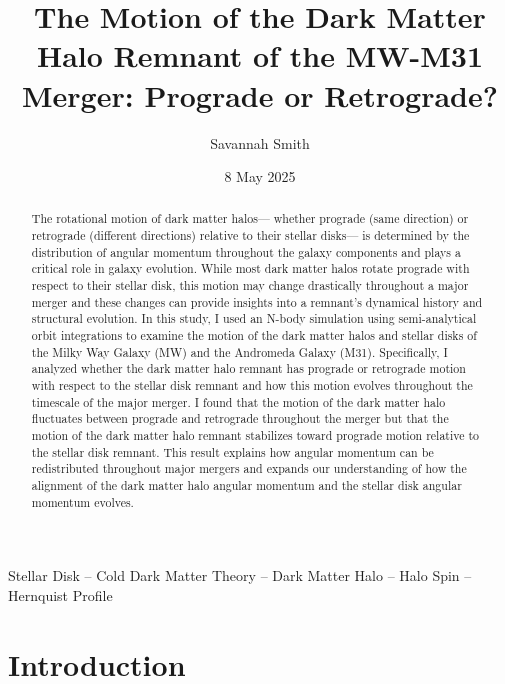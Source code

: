 \documentclass[fleqn,usenatbib]{mnras}
\title{The Motion of the Dark Matter Halo Remnant of the MW-M31 Merger: Prograde or Retrograde?}
\author{Savannah Smith}
\date{8 May 2025}
\begin{document}
\label{firstpage}
\pagerange{\pageref{firstpage}--\pageref{lastpage}}
\maketitle

\begin{abstract}
The rotational motion of dark matter halos--- whether prograde (same direction) or retrograde (different directions) relative to their stellar disks--- is determined by the distribution of angular momentum throughout the galaxy components and plays a critical role in galaxy evolution. While most dark matter halos rotate prograde with respect to their stellar disk, this motion may change drastically throughout a major merger and these changes can provide insights into a remnant's dynamical history and structural evolution. In this study, I used an N-body simulation using semi-analytical orbit integrations to examine the motion of the dark matter halos and stellar disks of the Milky Way Galaxy (MW) and the Andromeda Galaxy (M31). Specifically, I analyzed whether the dark matter halo remnant has prograde or retrograde motion with respect to the stellar disk remnant and how this motion evolves throughout the timescale of the major merger. I found that the motion of the dark matter halo fluctuates between prograde and retrograde throughout the merger but that the motion of the dark matter halo remnant stabilizes toward prograde motion relative to the stellar disk remnant. This result explains how angular momentum can be redistributed throughout major mergers and expands our understanding of how the alignment of the dark matter halo angular momentum and the stellar disk angular momentum evolves.
\end{abstract}

\begin{keywords}
Stellar Disk -- Cold Dark Matter Theory -- Dark Matter Halo -- Halo Spin -- Hernquist Profile
\end{keywords}




\section{Introduction}
\end{document}
